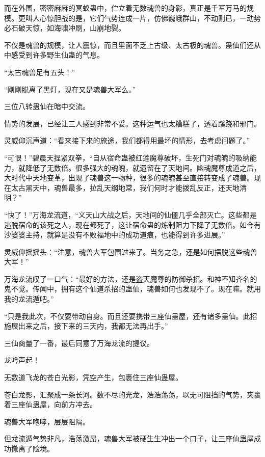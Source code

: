 
\begin{this_body}



而在外围，密密麻麻的冥蚁蛊中，伫立着无数魂兽的身影，真正是千军万马的规模。更叫人心惊胆战的是，它们气势连成一片，仿佛巍峨群山，不动则已，一动势必石破天惊，如海啸冲刷，山崩地裂。

不仅是魂兽的规模，让人震惊，而且里面不乏上古级、太古极的魂兽。蛊仙们还从中感受到许多野生仙蛊的气息。

“太古魂兽足有五头！”

“刚刚脱离了黑灯，现在又是魂兽大军么。”

三位八转蛊仙在暗中交流。

情势的发展，已经让三人感到非常不妥。这种运气也太糟糕了，透着蹊跷和邪门。

灵威仰沉声道：“看来接下来的旅途，我们都得用最坏的情形，去考虑问题了。”

“可恨！”碧晨天捏紧双拳，“自从宿命蛊被红莲魔尊破坏，生死门对魂魄的吸纳能力，就降低了无数倍。很多强大的魂魄，就遗留在了天地间。幽魂魔尊成道之后，大时代中天地变革，出现了魂兽这一物种，很多的魂魄甚至直接转变成了魂兽。现在太古黑天中，魂兽最多，拉乱天纲地常，我们何时才能拨乱反正，还天地清明？”

“快了！”万海龙流道，“义天山大战之后，天地间的仙僵几乎全部灭亡。这些都是逃脱宿命的该死之人，现在都死了，这让宿命蛊的炼制阻力下降了无数倍。如今有沙婆婆主持，就算是没有不败福地中的成功道痕，也能得到许多进展。”

灵威仰摇摇头：“注意，魂兽大军包围过来了。当务之急，还是如何摆脱这些魂兽大军！”

万海龙流叹了一口气：“最好的方法，还是盗天魔尊的防御杀招。和神不知齐名的鬼不觉。传闻中，拥有这个仙道杀招的蛊仙，魂兽如何也发现不了。现在嘛。就用我的龙流遁吧。”

“只是我此次，不仅要带动自身。而且还要携带三座仙蛊屋，还有诸多蛊仙。此招施展出来之后，接下来的三天内，我都无法再出手。”

三仙商量了一番，最后同意了万海龙流的提议。

龙吟声起！

无数道飞龙的苍白光影，凭空产生，包裹住三座仙蛊屋。

苍白龙影，汇聚成一条长河。数不尽的光龙，浩浩荡荡，以无可阻挡的气势，夹裹着三座仙蛊屋，向前方冲去。

魂兽大军咆哮，层层阻隔。

但龙流遁气势非凡，浩荡激昂，魂兽大军被硬生生冲出一个口子，让三座仙蛊屋成功撤离了险境。


\end{this_body}
